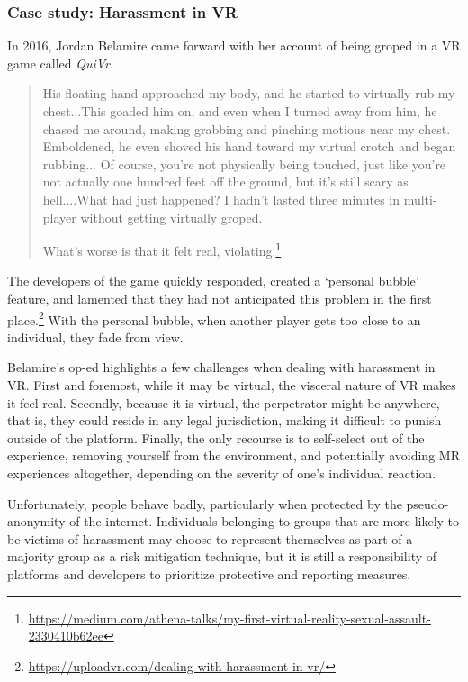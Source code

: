 
\subsubsection{Case study: Harassment in VR}
In 2016, Jordan Belamire came forward with her account of being groped in a VR game called \emph{QuiVr}.

\begin{quote}
His floating hand approached my body, and he started to virtually rub my chest...This goaded him on, and even when I turned away from him, he chased me around, making grabbing and pinching motions near my chest. Emboldened, he even shoved his hand toward my virtual crotch and began rubbing... Of course, you’re not physically being touched, just like you’re not actually one hundred feet off the ground, but it’s still scary as hell....What had just happened? I hadn’t lasted three minutes in multi-player without getting virtually groped. 

What’s worse is that it felt real, violating.\footnote{\url{https://medium.com/athena-talks/my-first-virtual-reality-sexual-assault-2330410b62ee}}
\end{quote}

The developers of the game quickly responded, created a `personal bubble' feature, and lamented that they had not anticipated this problem in the first place.\footnote{\url{https://uploadvr.com/dealing-with-harassment-in-vr/}} With the personal bubble, when another player gets too close to an individual, they fade from view.

Belamire's op-ed highlights a few challenges when dealing with harassment in VR. First and foremost, while it may be virtual, the visceral nature of VR makes it feel real. Secondly, because it is virtual, the perpetrator might be anywhere, that is, they could reside in any legal jurisdiction, making it difficult to punish outside of the platform. Finally, the only recourse is to self-select out of the experience, removing yourself from the environment, and potentially avoiding MR experiences altogether, depending on the severity of one's individual reaction.

Unfortunately, people behave badly, particularly when protected by the pseudo-anonymity of the internet. Individuals belonging to groups that are more likely to be victims of harassment may choose to represent themselves as part of a majority group as a risk mitigation technique, but it is still a responsibility of platforms and developers to prioritize protective and reporting measures.


